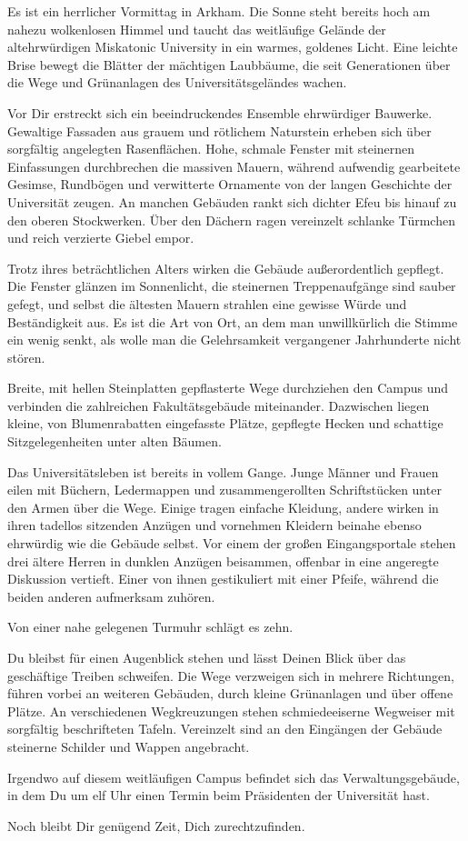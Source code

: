 \begin{vorlesetext}
Es ist ein herrlicher Vormittag in Arkham. Die Sonne steht bereits hoch am nahezu wolkenlosen Himmel und taucht das weitläufige Gelände der altehrwürdigen Miskatonic University in ein warmes, goldenes Licht. Eine leichte Brise bewegt die Blätter der mächtigen Laubbäume, die seit Generationen über die Wege und Grünanlagen des Universitätsgeländes wachen.

Vor Dir erstreckt sich ein beeindruckendes Ensemble ehrwürdiger Bauwerke. Gewaltige Fassaden aus grauem und rötlichem Naturstein erheben sich über sorgfältig angelegten Rasenflächen. Hohe, schmale Fenster mit steinernen Einfassungen durchbrechen die massiven Mauern, während aufwendig gearbeitete Gesimse, Rundbögen und verwitterte Ornamente von der langen Geschichte der Universität zeugen. An manchen Gebäuden rankt sich dichter Efeu bis hinauf zu den oberen Stockwerken. Über den Dächern ragen vereinzelt schlanke Türmchen und reich verzierte Giebel empor.

Trotz ihres beträchtlichen Alters wirken die Gebäude au\ss{}erordentlich gepflegt. Die Fenster glänzen im Sonnenlicht, die steinernen Treppenaufgänge sind sauber gefegt, und selbst die ältesten Mauern strahlen eine gewisse Würde und Beständigkeit aus. Es ist die Art von Ort, an dem man unwillkürlich die Stimme ein wenig senkt, als wolle man die Gelehrsamkeit vergangener Jahrhunderte nicht stören.

Breite, mit hellen Steinplatten gepflasterte Wege durchziehen den Campus und verbinden die zahlreichen Fakultätsgebäude miteinander. Dazwischen liegen kleine, von Blumenrabatten eingefasste Plätze, gepflegte Hecken und schattige Sitzgelegenheiten unter alten Bäumen.

Das Universitätsleben ist bereits in vollem Gange. Junge Männer und Frauen eilen mit Büchern, Ledermappen und zusammengerollten Schriftstücken unter den Armen über die Wege. Einige tragen einfache Kleidung, andere wirken in ihren tadellos sitzenden Anzügen und vornehmen Kleidern beinahe ebenso ehrwürdig wie die Gebäude selbst. Vor einem der gro\ss{}en Eingangsportale stehen drei ältere Herren in dunklen Anzügen beisammen, offenbar in eine angeregte Diskussion vertieft. Einer von ihnen gestikuliert mit einer Pfeife, während die beiden anderen aufmerksam zuhören.

Von einer nahe gelegenen Turmuhr schlägt es zehn.

Du bleibst für einen Augenblick stehen und lässt Deinen Blick über das geschäftige Treiben schweifen. Die Wege verzweigen sich in mehrere Richtungen, führen vorbei an weiteren Gebäuden, durch kleine Grünanlagen und über offene Plätze. An verschiedenen Wegkreuzungen stehen schmiedeeiserne Wegweiser mit sorgfältig beschrifteten Tafeln. Vereinzelt sind an den Eingängen der Gebäude steinerne Schilder und Wappen angebracht.

Irgendwo auf diesem weitläufigen Campus befindet sich das Verwaltungsgebäude, in dem Du um elf Uhr einen Termin beim Präsidenten der Universität hast.

Noch bleibt Dir genügend Zeit, Dich zurechtzufinden.
\end{vorlesetext}

